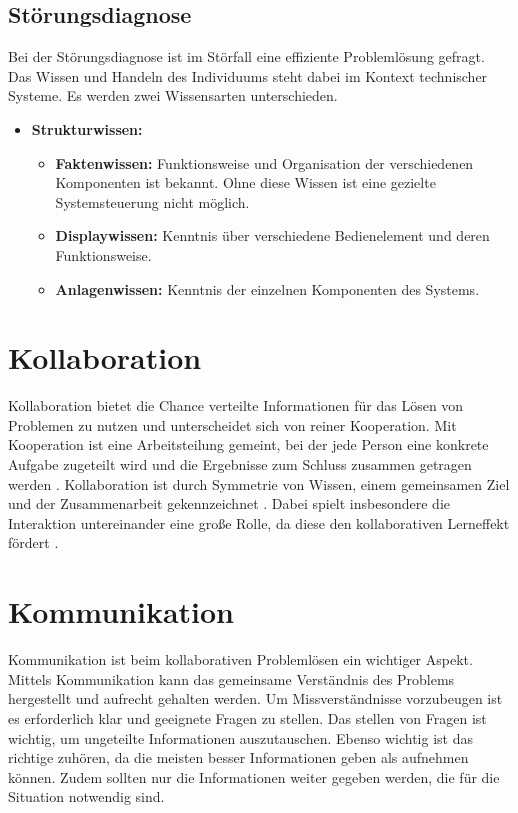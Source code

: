 \subsection{Störungsdiagnose}
Bei der Störungsdiagnose ist im Störfall eine effiziente Problemlösung gefragt. Das Wissen und Handeln des Individuums steht dabei im Kontext technischer Systeme. Es werden zwei Wissensarten unterschieden. 
\begin{itemize}
\item \textbf{Strukturwissen:} 
	\begin{itemize}
	\item \textbf{Faktenwissen:} Funktionsweise und Organisation der verschiedenen Komponenten ist bekannt. Ohne diese Wissen ist eine gezielte Systemsteuerung nicht möglich.
	\item \textbf{Displaywissen:} Kenntnis über verschiedene Bedienelement und deren Funktionsweise.
	\item \textbf{Anlagenwissen:} Kenntnis der einzelnen Komponenten des Systems.
	\end{itemize}
\end{itemize}

\section{Kollaboration}
Kollaboration bietet die Chance verteilte Informationen für das Lösen von Problemen zu nutzen und unterscheidet sich von reiner Kooperation. Mit Kooperation ist eine Arbeitsteilung gemeint, bei der jede Person eine konkrete Aufgabe zugeteilt wird und die Ergebnisse zum Schluss zusammen getragen werden \cite{Jermann2004}. Kollaboration ist durch Symmetrie von Wissen, einem gemeinsamen Ziel und der Zusammenarbeit gekennzeichnet \cite{Rummel1958}. Dabei spielt insbesondere die Interaktion untereinander eine große Rolle, da diese den kollaborativen Lerneffekt fördert \cite{Jermann2004}.

\section{Kommunikation}
Kommunikation ist beim kollaborativen Problemlösen ein wichtiger Aspekt. Mittels Kommunikation kann das gemeinsame Verständnis des Problems hergestellt und aufrecht gehalten werden. Um Missverständnisse vorzubeugen ist es erforderlich klar und geeignete Fragen zu stellen. Das stellen von Fragen ist wichtig, um ungeteilte Informationen auszutauschen. Ebenso wichtig ist das richtige zuhören, da die meisten besser Informationen geben als aufnehmen können. Zudem sollten nur die Informationen weiter gegeben werden, die für die Situation notwendig sind. \cite{Rohner2016}

